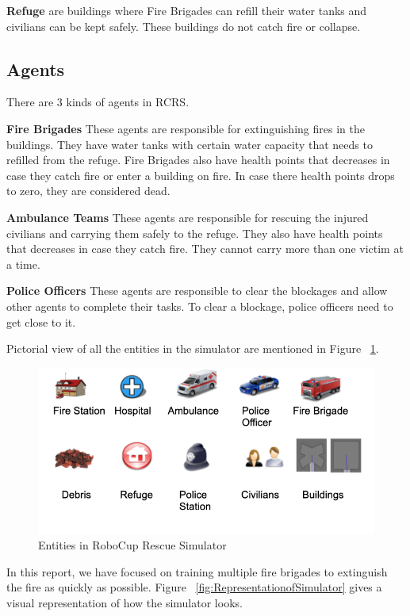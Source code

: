 \documentclass[12pt]{report}
\begin{document}
\textbf{Refuge} are buildings where Fire Brigades can refill their water tanks and civilians can be kept safely. These buildings do not catch fire or collapse. 

\subsection{Agents} There are 3 kinds of agents in RCRS. 

\textbf{Fire Brigades} These agents are responsible for extinguishing fires in the buildings. They have water tanks with certain water capacity that needs to refilled from the refuge. Fire Brigades also have health points that decreases in case they catch fire or enter a building on fire. In case there health points drops to zero, they are considered dead. 

\textbf{Ambulance Teams} These agents are responsible for rescuing the injured civilians and carrying them safely to the refuge. They also have health points that decreases in case they catch fire. They cannot carry more than one victim at a time. 

\textbf{Police Officers} These agents are responsible to clear the blockages and allow other agents to complete their tasks. To clear a blockage, police officers need to get close to it. 

Pictorial view of all the entities in the simulator are mentioned in Figure ~\ref{fig:RCRSActors}. 

\begin{figure}[!h]
    \centering
    \includegraphics[width=12cm]{RCRSActors.png}
    \caption{Entities in RoboCup Rescue Simulator}
    \label{fig:RCRSActors}
\end{figure}

\hfill

In this report, we have focused on training multiple fire brigades to extinguish the fire as quickly as possible. Figure ~\ref{fig:RepresentationofSimulator} gives a visual representation of how the simulator looks. 
\end{document}
